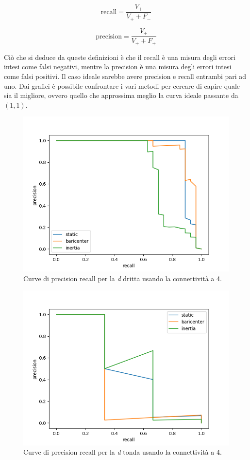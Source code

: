 \begin{equation*}
    \text{recall} = \frac{V_+}{V_+ + F_-}
\end{equation*}

\begin{equation*}
    \text{precision} = \frac{V_+}{V_+ + F_+}
\end{equation*}

Ci\`o che si deduce da queste definizioni \`e che il recall \`e una misura degli errori intesi come falsi negativi, mentre la precision \`e una misura degli errori intesi come falsi positivi. Il caso ideale sarebbe avere precision e recall entrambi pari ad uno. Dai grafici \`e possibile confrontare i vari metodi per cercare di capire quale sia il migliore, ovvero quello che approssima meglio la curva ideale passante da $(1, 1)$.

\begin{figure}
    \centering
    \includegraphics[width=.9\textwidth]{figures/graphs/D_drittaFalse.png}
    \caption{Curve di precision recall per la \emph{d} dritta usando la connettivit\`a a 4.}
    \label{fig:graph_D_dritta}
\end{figure}

\begin{figure}
    \centering
    \includegraphics[width=.9\textwidth]{figures/graphs/D_tondaFalse.png}
    \caption{Curve di precision recall per la \emph{d} tonda usando la connettivit\`a a 4.}
    \label{fig:graph_D_tonda}
\end{figure}

